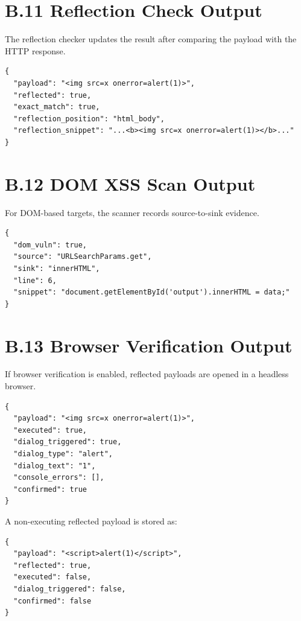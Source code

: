 \section*{B.11 Reflection Check Output}

The reflection checker updates the result after comparing the payload with the HTTP response.

\begin{lstlisting}[style=appendixcode,caption={Reflection check output}]
{
  "payload": "<img src=x onerror=alert(1)>",
  "reflected": true,
  "exact_match": true,
  "reflection_position": "html_body",
  "reflection_snippet": "...<b><img src=x onerror=alert(1)></b>..."
}
\end{lstlisting}

\section*{B.12 DOM XSS Scan Output}

For DOM-based targets, the scanner records source-to-sink evidence.

\begin{lstlisting}[style=appendixcode,caption={DOM XSS scan result format}]
{
  "dom_vuln": true,
  "source": "URLSearchParams.get",
  "sink": "innerHTML",
  "line": 6,
  "snippet": "document.getElementById('output').innerHTML = data;"
}
\end{lstlisting}

\section*{B.13 Browser Verification Output}

If browser verification is enabled, reflected payloads are opened in a headless browser.

\begin{lstlisting}[style=appendixcode,caption={Browser verification output}]
{
  "payload": "<img src=x onerror=alert(1)>",
  "executed": true,
  "dialog_triggered": true,
  "dialog_type": "alert",
  "dialog_text": "1",
  "console_errors": [],
  "confirmed": true
}
\end{lstlisting}

A non-executing reflected payload is stored as:

\begin{lstlisting}[style=appendixcode,caption={Negative browser verification output}]
{
  "payload": "<script>alert(1)</script>",
  "reflected": true,
  "executed": false,
  "dialog_triggered": false,
  "confirmed": false
}
\end{lstlisting}


